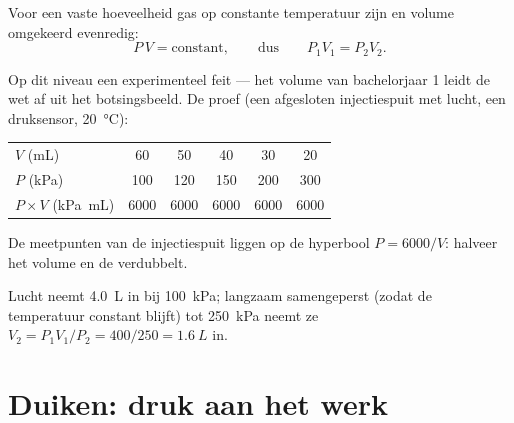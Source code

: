 \begin{proposition}\label{prop:g10:pressure:boyle}
Voor een vaste hoeveelheid gas op constante temperatuur zijn  en
volume omgekeerd evenredig:
\[
P \, V = \text{constant},
\qquad\text{dus}\qquad
P_1 V_1 = P_2 V_2 .
\]
\end{proposition}
\admitted

\begin{remark}
Op dit niveau een experimenteel feit --- het volume van bachelorjaar 1
leidt de wet af uit het botsingsbeeld. De proef (een afgesloten
injectiespuit met lucht, een druksensor,
\qty{20}{\degreeCelsius}):
\begin{center}
\begin{tabular}{lccccc}
$V$ (\unit{mL}) & 60 & 50 & 40 & 30 & 20 \\
$P$ (\unit{kPa}) & 100 & 120 & 150 & 200 & 300 \\
$P \times V$ (\unit{kPa.mL}) & 6000 & 6000 & 6000 & 6000 & 6000
\end{tabular}
\end{center}
\end{remark}

\begin{omfigure}

{\small De meetpunten van de injectiespuit liggen op de hyperbool
$P = 6000/V$: halveer het volume en de  verdubbelt.}
\end{omfigure}

\begin{example}\label{ex:g10:pressure:boyle}
Lucht neemt \qty{4.0}{L} in bij \qty{100}{kPa}; langzaam samengeperst
(zodat de temperatuur constant blijft) tot \qty{250}{kPa} neemt ze
$V_2 = P_1 V_1 / P_2 = 400/250 = \qty{1.6}{L}$ in.
\end{example}

\section{Duiken: druk aan het werk}

